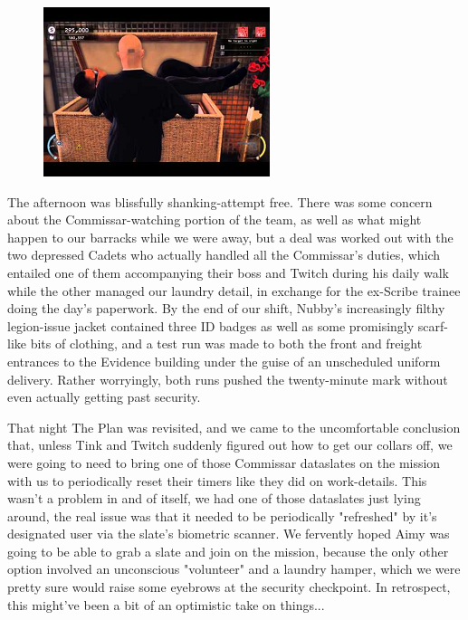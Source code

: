 \begin{figure}
	\begin{center}
		\includegraphics[width=\figwidth]{pics/21/40.png}
	\end{center}
\end{figure}
The afternoon was blissfully shanking-attempt free. 
There was some concern about the Commissar-watching portion of the team, as well as what might happen to our barracks while we were away, but a deal was worked out with the two depressed Cadets who actually handled all the Commissar's duties, which entailed one of them accompanying their boss and Twitch during his daily walk while the other managed our laundry detail, in exchange for the ex-Scribe trainee doing the day's paperwork. 
By the end of our shift, Nubby's increasingly filthy legion-issue jacket contained three ID badges as well as some promisingly scarf-like bits of clothing, and a test run was made to both the front and freight entrances to the Evidence building under the guise of an unscheduled uniform delivery. 
Rather worryingly, both runs pushed the twenty-minute mark without even actually getting past security.

That night The Plan was revisited, and we came to the uncomfortable conclusion that, unless Tink and Twitch suddenly figured out how to get our collars off, we were going to need to bring one of those Commissar dataslates on the mission with us to periodically reset their timers like they did on work-details. 
This wasn't a problem in and of itself, we had one of those dataslates just lying around, the real issue was that it needed to be periodically "refreshed" by it's designated user via the slate's biometric scanner. 
We fervently hoped Aimy was going to be able to grab a slate and join on the mission, because the only other option involved an unconscious "volunteer" and a laundry hamper, which we were pretty sure would raise some eyebrows at the security checkpoint. 
In retrospect, this might've been a bit of an optimistic take on things...

